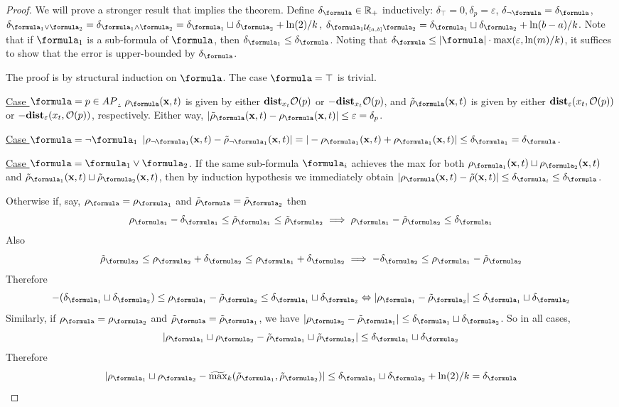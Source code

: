 \begin{proof}
	We will prove a stronger result that implies the theorem.	
	Define $\delta_\formula \in \Re_+$ inductively: 
	$\delta_\top = 0, \delta_p = \varepsilon$, $\delta_{\neg \formula} = \delta_\formula$, 
	$\delta_{\formula_1 \lor \formula_2} = \delta_{\formula_1 \land \formula_2} = \delta_{\formula_1} \sqcup \delta_{\formula_2} + \ln(2)/k$,
	$\delta_{\formula_1 \until_{[a,b]} \formula_2}  = \delta_{\formula_1} \sqcup \delta_{\formula_2} + \ln(b-a)/k$.
	Note that if $\formula_1$ is a sub-formula of $\formula$, then $\delta_{\formula_1} \leq \delta_\formula$.
	Noting that $\delta_\formula \leq |\formula| \cdot \max(\varepsilon,\ln(m)/k)$, it suffices to show that the error is upper-bounded by $\delta_\formula$.
	
	The proof is by structural induction on $\formula$. 	
	The case $\formula = \top$ is trivial.
	
\underline{Case $\formula = p \in AP$.}
$\robf(\sstraj,t)$ is given by either $\mathbf{dist}_{x_t}{\mathcal{O}(p)}$ or $-\mathbf{dist}_{x_t}{\mathcal{O}(p)}$, and 
$\srobf(\sstraj,t)$ is given by either $\mathbf{dist}_\varepsilon(x_t,\mathcal{O}(p))$ or $-\mathbf{dist}_\varepsilon(x_t,\mathcal{O}(p))$, respectively.
Either way, $|\srobf(\sstraj,t) - \robf(\sstraj,t)| \leq \varepsilon = \delta_{p}$.

\underline{Case $\formula = \neg \formula_1$} 
$|\rob_{\neg \formula_1}(\sstraj,t)-\srob_{\neg \formula_1}(\sstraj,t)| = |-\rob_{\formula_1}(\sstraj,t) + \rob_{ \formula_1}(\sstraj,t)|  \leq \delta_{\formula_1} = \delta_\formula$.

\underline{Case $\formula = \formula_1 \lor \formula_2$}.
If the same sub-formula $\formula_i$ achieves the max for both $\rob_{\formula_1}(\sstraj,t) \sqcup \rob_{\formula_2}(\sstraj,t)$ and $\srob_{\formula_1}(\sstraj,t) \sqcup \srob_{\formula_2}(\sstraj,t)$, then by induction hypothesis we immediately obtain 
$|\robf(\sstraj,t)-\srob(\sstraj,t)|  \leq \delta_{\formula_i} \leq \delta_{\formula}$.

Otherwise if, say, $\robf = \rob_{\formula_1}$ and $\srobf = \srob_{\formula_2}$ then
\[\robfa -\delta_{\formula_1} \leq \srob_{\formula_1} \leq \srob_{\formula_2} \implies \robfa-\srob_{\formula_2} \leq \delta_{\formula_1}\]
Also 
\[\srob_{\formula_2} \leq \robfb+\delta_{\formula_2} \leq \robfa + \delta_{\formula_2} \implies -\delta_{\formula_2} \leq \robfa - \srob_{\formula_2}\]
Therefore
\begin{equation*}
\label{eq:inter}
-(\delta_{\formula_1} \sqcup \delta_{\formula_2})\leq \robfa - \srob_{\formula_2}\leq \delta_{\formula_1} \sqcup \delta_{\formula_2} \Leftrightarrow |\robfa - \srob_{\formula_2}|\leq \delta_{\formula_1} \sqcup \delta_{\formula_2}
\end{equation*}
Similarly, if $\robf = \rob_{\formula_2}$ and $\srobf = \srob_{\formula_1}$, we have $|\robfb - \srob_{\formula_1}|\leq  \delta_{\formula_1} \sqcup \delta_{\formula_2}$.
So in all cases, 
\[|\robfa \sqcup \robfb - \srob_{\formula_1} \sqcup \srob_{\formula_2}|\leq \delta_{\formula_1} \sqcup \delta_{\formula_2}\]
Therefore 
\[|\robfa \sqcup \robfb - \smax_k(\srob_{\formula_1} , \srob_{\formula_2})|\leq  \delta_{\formula_1} \sqcup \delta_{\formula_2} + \ln(2)/k  = \delta_\formula\]


\end{proof}
